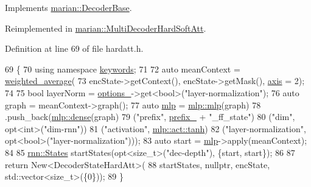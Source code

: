 Implements \hyperlink{classmarian_1_1DecoderBase_a26b37dc5cebf21cea9e1f8b5ef5c8040}{marian\+::\+Decoder\+Base}.



Reimplemented in \hyperlink{classmarian_1_1MultiDecoderHardSoftAtt_a82443e3da9466ff952ac9deeb0a77df6}{marian\+::\+Multi\+Decoder\+Hard\+Soft\+Att}.



Definition at line 69 of file hardatt.\+h.


\begin{DoxyCode}
69                                                                    \{
70     \textcolor{keyword}{using namespace }\hyperlink{namespacekeywords}{keywords};
71 
72     \textcolor{keyword}{auto} meanContext = \hyperlink{namespacemarian_a8ccb9507a69a32ecd48410fd1557f209}{weighted\_average}(
73         encState->getContext(), encState->getMask(), \hyperlink{namespacemarian_1_1keywords_ace9158eabbddaca833133f12da98b9d6}{axis} = 2);
74 
75     \textcolor{keywordtype}{bool} layerNorm = \hyperlink{classmarian_1_1DecoderBase_a75375e7661a014fd15bbee3b0a047b91}{options\_}->get<\textcolor{keywordtype}{bool}>(\textcolor{stringliteral}{"layer-normalization"});
76     \textcolor{keyword}{auto} graph = meanContext->graph();
77     \textcolor{keyword}{auto} \hyperlink{namespacemarian_1_1mlp_a4d0fe240d31bdc33bcbdb5401de49e27}{mlp} = \hyperlink{namespacemarian_1_1mlp_a4d0fe240d31bdc33bcbdb5401de49e27}{mlp::mlp}(graph)
78                .push\_back(\hyperlink{namespacemarian_1_1mlp_a8c25b1e343bf78e66cd9e33e607efeb5}{mlp::dense}(graph)
79                           (\textcolor{stringliteral}{"prefix"}, \hyperlink{classmarian_1_1DecoderBase_a043a90801b6bda9a45e309607136e947}{prefix\_} + \textcolor{stringliteral}{"\_ff\_state"})
80                           (\textcolor{stringliteral}{"dim"}, opt<int>(\textcolor{stringliteral}{"dim-rnn"}))
81                           (\textcolor{stringliteral}{"activation"}, \hyperlink{namespacemarian_1_1mlp_ac16d27a877d16d7394f2057aee439d72a5c0dbba3a6ee4ac0eb26cfee75ccb8b4}{mlp::act::tanh})
82                           (\textcolor{stringliteral}{"layer-normalization"}, opt<bool>(\textcolor{stringliteral}{"layer-normalization"})));
83     \textcolor{keyword}{auto} start = \hyperlink{namespacemarian_1_1mlp_a4d0fe240d31bdc33bcbdb5401de49e27}{mlp}->apply(meanContext);
84 
85     \hyperlink{namespaceamunmt_a4fe2912e208820f8217fbcf229ebacf7}{rnn::States} startStates(opt<size\_t>(\textcolor{stringliteral}{"dec-depth"}), \{start, start\});
86 
87     \textcolor{keywordflow}{return} New<DecoderStateHardAtt>(
88         startStates, \textcolor{keyword}{nullptr}, encState, std::vector<size\_t>(\{0\}));
89   \}
\end{DoxyCode}


